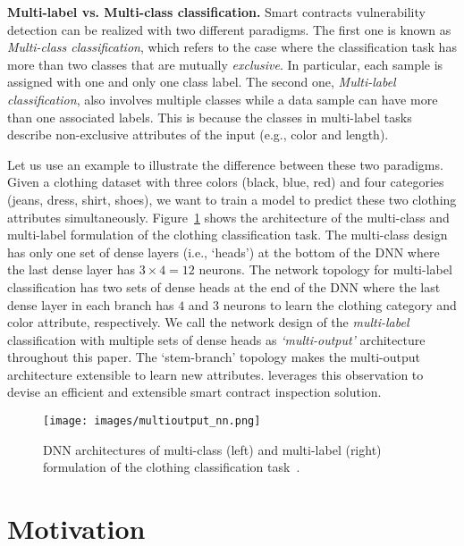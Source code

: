 \textbf{Multi-label vs. Multi-class classification.} 
Smart contracts vulnerability detection can be realized with two different paradigms. The first one is known as  
\textit{Multi-class classification}, which refers to the case where the classification task has more than two classes that are mutually \textit{exclusive}. In particular, each sample is assigned with {one and only one} class label.
The second one, \textit{Multi-label classification}, also involves multiple classes while a data sample can have more than one associated labels. This is because the classes in multi-label tasks describe non-exclusive attributes of the input (e.g., color and length). 

Let us use an example to illustrate the difference between these two paradigms.  
Given a clothing dataset with three colors (black, blue, red) and four categories (jeans, dress, shirt, shoes), we want to train a model to predict these two clothing attributes simultaneously. 
Figure~\ref{fig:multioutput_nn} shows the architecture of the multi-class and multi-label formulation of the clothing classification task. 
The multi-class design has only one set of dense layers (i.e., `heads') at the bottom of the DNN where the last dense layer has $3\times4=12$ neurons.
The network topology for multi-label classification has two sets of dense heads at the end of the DNN where the last dense layer in each branch has $4$ and $3$ neurons to learn the clothing category and color attribute, respectively.  
We call the network design of the \textit{multi-label} classification with multiple sets of dense heads as \textit{`multi-output'} architecture throughout this paper.  
The `stem-branch' topology makes the multi-output architecture extensible to learn new attributes. 
\sys{} leverages this observation to devise an efficient and extensible smart contract inspection solution. 

\vspace{-1em}
\begin{figure}[ht!]
  \centering
  \texttt{[image: images/multioutput\_nn.png]}
  \vspace{-0.5em}
  \caption{DNN architectures of multi-class (left) and multi-label (right) formulation of the clothing classification task~\cite{multi_output}. 
  }
  \label{fig:multioutput_nn}
  \vspace{-0.3em}
\end{figure}
\section{Motivation} \label{sec:motiv}

